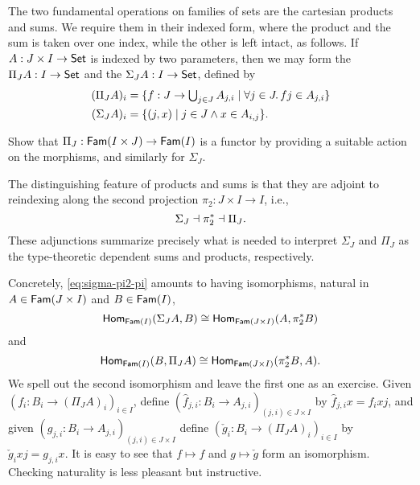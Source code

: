 The two fundamental operations on families of sets are the cartesian products and sums. We require them in their indexed form, where the product and the sum is taken over one index, while the other is left intact, as follows.
%
If $A : J \times I \to \Set$ is indexed by two parameters, then we may form the  $\Pi_J A : I \to \Set$ and the  $\Sigma_J A : I \to \Set$, defined by
%
\begin{align*}
  (\Pi_J A)_i &=
    \set{ f : J \to \textstyle\bigcup_{j \in J} A_{j,i} \such \all{j \in J} f j \in A_{j,i} }
  \\
  (\Sigma_J A)_i &= \set{ (j, x) \such j \in J \land x \in A_{i,j} }.
\end{align*}

\begin{exercise}
  Show that $\Pi_J : \Fam{I \times J} \to \Fam{I}$ is a functor by providing a suitable action on the morphisms, and similarly for $\Sigma_J$.
\end{exercise}

The distinguishing feature of products and sums is that they are adjoint to reindexing along the second projection $\pi_2 : J \times I \to I$, i.e.,
%
\begin{equation}
  \label{eq:sigma-pi2-pi}
  \Sigma_J \dashv \invim{\pi_2} \dashv \Pi_J.
\end{equation}
%
These adjunctions summarize precisely what is needed to interpret $\Sigma_J$ and $\Pi_J$ as the type-theoretic dependent sums and products, respectively.

Concretely, \eqref{eq:sigma-pi2-pi} amounts to having isomorphisms, natural in $A \in \Fam{J \times I}$ and $B \in \Fam{I}$,
%
\begin{equation*}
  \Hom[\Fam{I}]{\Sigma_J A, B}
  \cong
  \Hom[\Fam{J \times I}]{A, \invim{\pi_2} B}
\end{equation*}
%
and
%
\begin{equation*}
  \Hom[\Fam{I}]{B, \Pi_J A}
  \cong
  \Hom[\Fam{J \times I}]{\invim{\pi_2} B, A}.
\end{equation*}
%
We spell out the second isomorphism and leave the first one as an exercise.
%
Given $(f_i : B_i \to (\Pi_J A)_i)_{i \in I}$, define $(\hat{f}_{j,i} : B_i \to A_{j,i})_{(j,i) \in J \times I}$ by $\hat{f}_{j,i} x = f_i x j$, and given $(g_{j,i} : B_i \to A_{j,i})_{(j,i) \in J \times I}$ define $(\check{g}_i : B_i \to (\Pi_J A)_i)_{i \in I}$ by $\check{g}_i x j = g_{j,i} x$. It is easy to see that $f \mapsto \hat{f}$ and $g \mapsto \check{g}$ form an isomorphism. Checking naturality is less pleasant but instructive.

